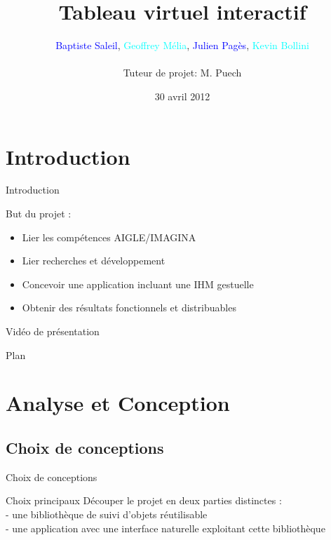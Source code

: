 \documentclass{beamer}
\title{Tableau virtuel interactif}
\author{\textcolor{blue}{Baptiste Saleil}, \textcolor{cyan}{Geoffrey Mélia}, \textcolor{blue}{Julien Pagès}, \textcolor{cyan}{Kevin Bollini} \\ \ \\Tuteur de projet: M. Puech}
\date{30 avril 2012}
\begin{document}
	\begin{frame}
		\titlepage
	\end{frame}

	\section{Introduction}
	\begin{frame}{Introduction}
        
	\begin{block}{But du projet :}
               \begin{itemize}
			\item Lier les compétences AIGLE/IMAGINA
			\item Lier recherches et développement
			\item Concevoir une application incluant une IHM gestuelle
			\item Obtenir des résultats fonctionnels et distribuables
		\end{itemize}
        \end{block}
            
	\end{frame}

      \begin{frame}{Vidéo de présentation}
      \end{frame}

      \begin{frame}{Plan}
            \tableofcontents[hideallsubsections]
      \end{frame}
            
      \section{Analyse et Conception}
      \subsection{Choix de conceptions}
            \begin{frame}{Choix de conceptions}
                  \begin{block}{Choix principaux}
                        Découper le projet en deux parties distinctes : \\
                        - une bibliothèque de suivi d'objets réutilisable \\
                        - une application avec une interface naturelle exploitant cette bibliothèque \\
                  \end{block}
            \end{frame}
            
\end{document}
